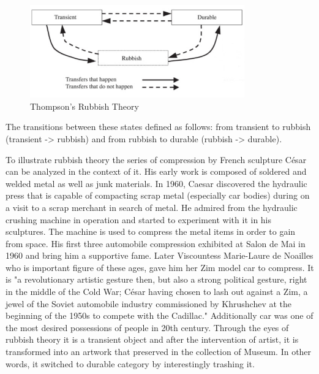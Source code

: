 \begin{figure}[h!]
  \centering
  \includegraphics[height=4cm]{graphics/rubbish_theory.jpg}
  \caption{Thompson’s Rubbish Theory}
  \label{fig:rubish_theory}
\end{figure}

The transitions between these states defined as follows: from transient to rubbish (transient -> rubbish) and from rubbish to durable (rubbish -> durable). 

To illustrate rubbish theory the series of compression by French sculpture César can be analyzed in the context of it. His early work is composed of soldered and welded metal as well as junk materials. In 1960, Caesar discovered the hydraulic press that is capable of compacting scrap metal (especially car bodies) during on a visit to a scrap merchant in search of metal. He admired from the hydraulic crushing machine in operation and started to experiment with it in his sculptures. The machine is used to compress the metal items in order to gain from space. His first three automobile compression exhibited at Salon de Mai in 1960 and bring him a supportive fame. Later Viscountess Marie-Laure de Noailles who is important figure of these ages, gave him her Zim model car to compress. It is 
"a revolutionary artistic gesture then, but also a strong political gesture, right in the middle of the Cold War; César having chosen to lash out against a Zim, a jewel of the Soviet automobile industry commissioned by Khrushchev at the beginning of the 1950s to compete with the Cadillac." Additionally car was one of the most desired possessions of people in 20th century. Through the eyes of rubbish theory it is a transient object and after the intervention of artist, it is transformed into an artwork that preserved in the collection of Museum. In other words, it switched to durable category by interestingly trashing it. 


